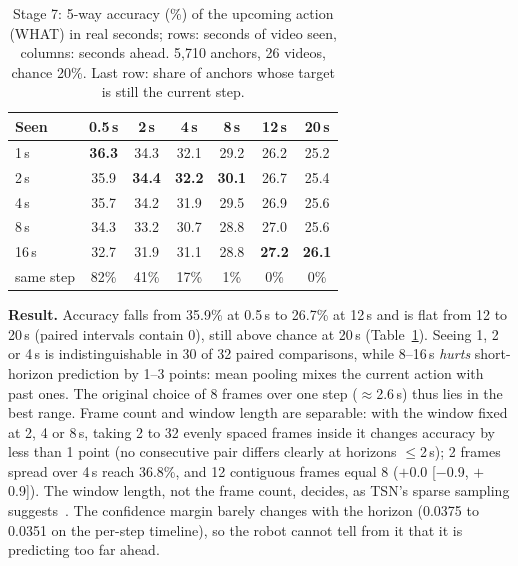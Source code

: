 \documentclass[conference,a4paper]{IEEEtran}
\begin{document}
\begin{table}[t]
\caption{Stage 7: 5-way accuracy (\%) of the upcoming action (WHAT) in real seconds; rows: seconds of video seen, columns: seconds ahead. 5,710 anchors, 26 videos, chance 20\%. Last row: share of anchors whose target is still the current step.}
\label{tab:time}
\centering
\footnotesize
\setlength{\tabcolsep}{4pt}
\begin{tabular}{lcccccc}
\toprule
Seen & 0.5\,s & 2\,s & 4\,s & 8\,s & 12\,s & 20\,s \\
\midrule
1\,s  & \textbf{36.3} & 34.3 & 32.1 & 29.2 & 26.2 & 25.2 \\
2\,s  & 35.9 & \textbf{34.4} & \textbf{32.2} & \textbf{30.1} & 26.7 & 25.4 \\
4\,s  & 35.7 & 34.2 & 31.9 & 29.5 & 26.9 & 25.6 \\
8\,s  & 34.3 & 33.2 & 30.7 & 28.8 & 27.0 & 25.6 \\
16\,s & 32.7 & 31.9 & 31.1 & 28.8 & \textbf{27.2} & \textbf{26.1} \\
\midrule
same step & 82\% & 41\% & 17\% & 1\% & 0\% & 0\% \\
\bottomrule
\end{tabular}
\end{table}

\textbf{Result.} Accuracy falls from 35.9\% at 0.5\,s to 26.7\% at 12\,s and is flat from 12 to 20\,s (paired intervals contain 0), still above chance at 20\,s (Table~\ref{tab:time}). Seeing 1, 2 or 4\,s is indistinguishable in 30 of 32 paired comparisons, while 8--16\,s \emph{hurts} short-horizon prediction by 1--3 points: mean pooling mixes the current action with past ones. The original choice of 8 frames over one step ($\approx$2.6\,s) thus lies in the best range. Frame count and window length are separable: with the window fixed at 2, 4 or 8\,s, taking 2 to 32 evenly spaced frames inside it changes accuracy by less than 1 point (no consecutive pair differs clearly at horizons $\le$2\,s); 2 frames spread over 4\,s reach 36.8\%, and 12 contiguous frames equal 8 ($+$0.0 [$-$0.9, $+$0.9]). The window length, not the frame count, decides, as TSN's sparse sampling suggests~\cite{wang2016tsn}. The confidence margin barely changes with the horizon (0.0375 to 0.0351 on the per-step timeline), so the robot cannot tell from it that it is predicting too far ahead.
\end{document}
